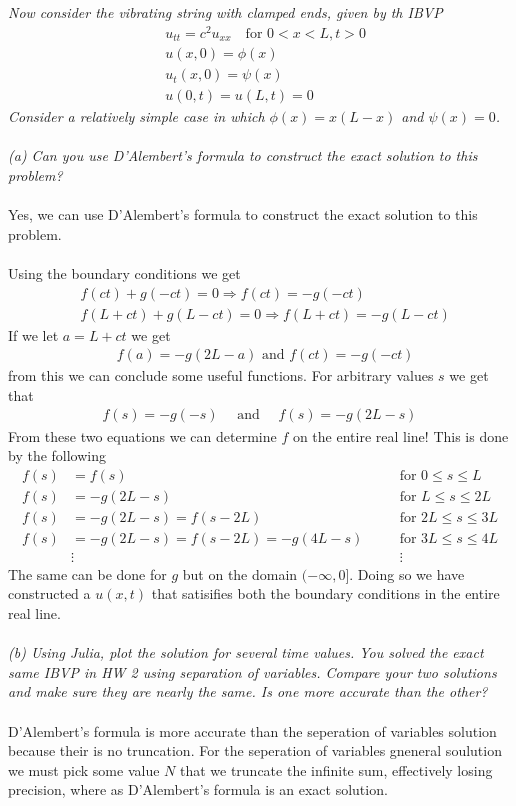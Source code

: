 \documentclass[12pt]{article}
\theoremstyle{remark}
\begin{document}
\textit{Now consider the vibrating string with clamped ends, given by th IBVP}
\begin{align*}
& u_{tt} = c^2u_{xx} \quad \text{for } 0 < x < L, t > 0 \\
& u(x,0) = \phi(x) \\
& u_t(x,0) = \psi(x) \\
& u(0,t) = u(L,t) = 0 
\end{align*}
\textit{Consider a relatively simple case in which $\phi(x) = x(L-x)$ and $\psi(x) = 0$.} \\ \\
\textit{(a) Can you use D'Alembert's formula to construct the exact solution to this problem?} \\ \\
Yes, we can use D'Alembert's formula to construct the exact solution to this problem. \\ \\
Using the boundary conditions we get 
\begin{align*}
& f(ct) + g(-ct) = 0 \Rightarrow f(ct) = - g(-ct) \\
& f(L+ct) + g(L-ct) = 0 \Rightarrow f(L+ct) = -g(L-ct)
\end{align*}
If we let $a = L + ct$ we get
\begin{align*}
& f(a) = -g(2L-a) \text{ and } f(ct) = -g(-ct)
\end{align*}
from this we can conclude some useful functions. For arbitrary values $s$ we get that
\begin{align*}
f(s) = -g(-s) \quad \text{ and } \quad f(s) = -g(2L-s)
\end{align*}
From these two equations we can determine $f$ on the entire real line! This is done by the following
\begin{align*}
f(s) & = f(s) \quad && \text{for } 0 \leq s \leq L \\
f(s) & = -g(2L-s) \quad &&  \text{for } L \leq s \leq 2L \\
f(s) & = -g(2L-s) = f(s-2L) \quad && \text{for } 2L\leq s \leq 3L \\
f(s) & = -g(2L-s) = f(s-2L) = -g(4L - s) \quad && \text{for } 3L \leq s \leq 4L \\
& \vdots && \vdots
\end{align*}
The same can be done for $g$ but on the domain $(-\infty,0]$. Doing so we have constructed a $u(x,t)$ that satisifies both the boundary conditions in the entire real line. \\ \\
\textit{(b) Using Julia, plot the solution for several time values. You solved the exact same IBVP in HW 2 using separation of variables. Compare your two solutions and make sure they are nearly the same. Is one more accurate than the other?} \\ \\
D'Alembert's formula is more accurate than the seperation of variables solution because their is no truncation. For the seperation of variables gneneral soulution we must pick some value $N$ that we truncate the infinite sum, effectively losing precision, where as D'Alembert's formula is an exact solution. 
\end{document}

